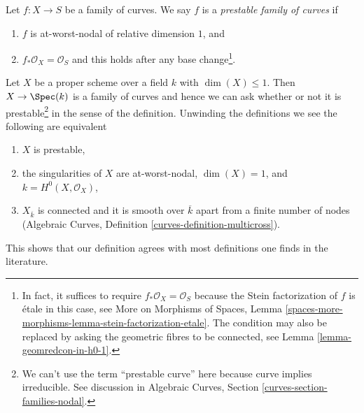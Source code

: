 \begin{definition}
\label{definition-prestable}
Let $f : X \to S$ be a family of curves. We say $f$ is a
{\it prestable family of curves} if
\begin{enumerate}
\item $f$ is at-worst-nodal of relative dimension $1$, and
\item $f_*\mathcal{O}_X = \mathcal{O}_S$ and this holds after
any base change\footnote{In fact, it suffices to require
$f_*\mathcal{O}_X = \mathcal{O}_S$ because the Stein factorization
of $f$ is \'etale in this case, see
More on Morphisms of Spaces, Lemma
\ref{spaces-more-morphisms-lemma-stein-factorization-etale}.
The condition may also be replaced by asking the geometric
fibres to be connected, see Lemma \ref{lemma-geomredcon-in-h0-1}.}.
\end{enumerate}
\end{definition}

\noindent
Let $X$ be a proper scheme over a field $k$ with $\dim(X) \leq 1$.
Then $X \to \Spec(k)$ is a family of curves and hence we can ask
whether or not it is prestable\footnote{We can't use the term
``prestable curve'' here because curve implies irreducible. See
discussion in Algebraic Curves, Section \ref{curves-section-families-nodal}.}
in the sense of the definition. Unwinding the definitions we see
the following are equivalent
\begin{enumerate}
\item $X$ is prestable,
\item the singularities of $X$ are at-worst-nodal, $\dim(X) = 1$,
and $k = H^0(X, \mathcal{O}_X)$,
\item $X_{\overline{k}}$ is connected and it is smooth over $\overline{k}$
apart from a finite number of nodes
(Algebraic Curves, Definition \ref{curves-definition-multicross}).
\end{enumerate}
This shows that our definition agrees with most definitions one finds
in the literature.

